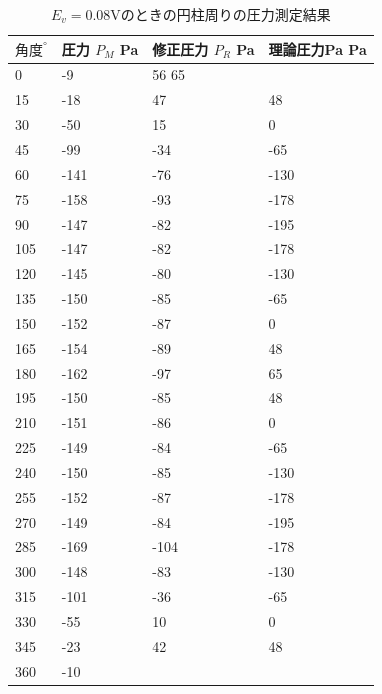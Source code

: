 \documentclass[twocolumn,10pt,a4j]{jsarticle}
\begin{document}
      \begin{table}[]
        \centering
          \caption{$E_{v}=0.08$Vのときの円柱周りの圧力測定結果}
          \label{my-label}
          \footnotesize
          \begin{tabular}{llll}
            $角度^\circ$ & 圧力 $P_{M}$ Pa & 修正圧力 $P_{R}$ Pa & 理論圧力Pa Pa\\ \hline
            0&	-9&	56 	65  \\
            15&	-18&	47& 	48 \\ 
            30&	-50&	15&	0  \\
            45&	-99&	-34& 	-65 \\ 
            60&	-141&	-76& 	-130  \\
            75&	-158&	-93& 	-178  \\
            90&	-147&	-82& 	-195  \\
            105&	-147&	-82& 	-178  \\
            120&	-145&	-80& 	-130  \\
            135&	-150&	-85& 	-65  \\
            150&	-152&	-87& 	0  \\
            165&	-154&	-89& 	48  \\
            180&	-162&	-97& 	65  \\
            195&	-150&	-85& 	48  \\
            210&	-151&	-86& 	0  \\
            225&	-149&	-84& 	-65  \\
            240&	-150&	-85& 	-130  \\
            255&	-152&	-87&	-178  \\
            270&	-149&	-84& 	-195  \\
            285&	-169&	-104& 	-178  \\
            300&	-148&	-83& 	-130  \\
            315&	-101&	-36& 	-65  \\
            330&	-55&	10& 	0  \\
            345&	-23&	42& 	48  \\
            360&	-10&		
          \end{tabular}
      \end{table}
\end{document}
